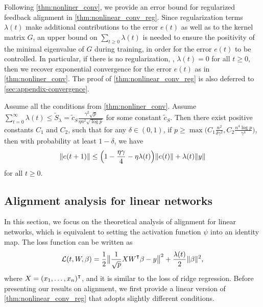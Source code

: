 Following \cref{thm:nonliner_conv}, we provide an error bound for regularized feedback alignment in \cref{thm:nonlinear_conv_reg}. Since regularization terms $\lambda(t)$ make additional contributions to the error $e(t)$ as well as to the kernel matrix $G$, an upper bound on $\sum_{t\geq 0}\lambda(t)$ is needed to ensure the positivity of the minimal eigenvalue of $G$ during training, in order for the error $e(t)$ to be controlled. In particular, if there is no regularization, \ie, $\lambda(t)=0$ for all $t\geq 0$, then we recover exponential convergence for the error $e(t)$ as in \cref{thm:nonliner_conv}. The proof of \cref{thm:nonlinear_conv_reg} is also deferred to \cref{sec:appendix-convergence}.

\begin{theorem}
\label{thm:nonlinear_conv_reg}
Assume all the conditions from \cref{thm:nonliner_conv}. Assume $\sum_{t=0}^\infty \lambda(t) \leq  \tilde{S}_\lambda = \tilde{c}_{S}\frac{\gamma^2\sqrt{p}}{\eta n^2\sqrt{\log p}}$ for some constant $\tilde{c}_{S}$. Then there exist positive constants $C_1$ and $C_2$, such that for any $\delta\in(0,1)$, if $p \geq \max\bigl(C_1\frac{n^2}{\delta\gamma^2}, C_2\frac{n^4\log p}{\gamma^4}\bigr)$, then with probability at least $1-\delta$, we have
\begin{equation}
\label{eq:conv_reg}
    \|e(t+1)\| \leq \Bigl(1-\frac{\eta\gamma}{4}-\eta\lambda(t)\Bigr)\|e(t)\|+\lambda(t)\|y\|
\end{equation}
for all $t\geq 0$.
\end{theorem}



\subsection{Alignment analysis for linear networks}
In this section, we focus on the theoretical analysis of alignment for linear networks, which is equivalent to setting the activation function $\psi$ into an identity map. The loss function can be written as
\begin{equation*}
    \Loss(t,W,\beta) = \frac{1}{2}\big\|\frac{1}{\sqrt{p}}XW\transpose\beta-y\big\|^2+\frac{\lambda(t)}{2}\|\beta\|^2,
\end{equation*}
where $X = (x_1,\ldots,x_n)\transpose$, and it is similar to the loss of ridge regression.
Before presenting our results on alignment, we first provide a linear version of \cref{thm:nonlinear_conv_reg} that adopts slightly different conditions.

